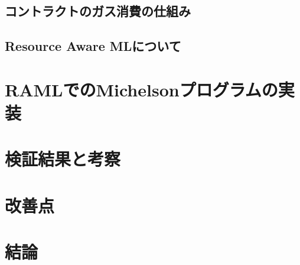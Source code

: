\documentclass{kuisthesis}
\begin{document}
\subsection{コントラクトのガス消費の仕組み}\label{subsec-pre-gas}

\subsection{Resource Aware MLについて}\label{subsec-pre-raml}

\section{RAMLでのMichelsonプログラムの実装}

\section{検証結果と考察}

\section{改善点}

\section{結論}\label{sec-conclusion}

\acknowledgments

\nocite{*}


\end{document}
